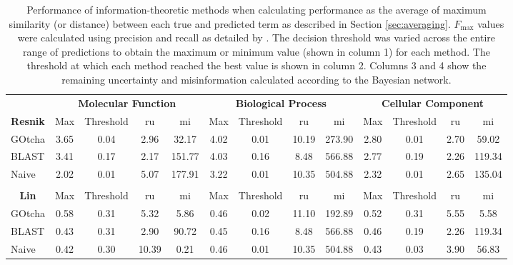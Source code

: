 \begin{table}[h!]
\caption[Performance evaluation of metrics using max-averaging]{Performance of information-theoretic methods when calculating performance as the average of maximum similarity (or distance) between each true and predicted term as described in Section \ref{sec:averaging}. $F_{\max}$ values were calculated using precision and recall as detailed by  \citet{Verspoor2006}. The decision threshold was varied across the entire range of predictions to obtain the maximum or minimum value (shown in column 1) for each method. The threshold at which each method reached the best value is shown in column 2. Columns 3 and 4 show the remaining uncertainty and misinformation calculated according to the Bayesian network.
\label{tab:rumiS1}}
\resizebox{\columnwidth}{!}
{\begin{tabular}{c|cccc|cccc|cccc}

\multicolumn{1}{l}{\hphantom} &\multicolumn{4}{c}{\bf Molecular Function } & \multicolumn{4}{c}{\bf Biological Process} &  \multicolumn{4}{c}{\bf Cellular Component } \\


\bf Resnik & Max & Threshold & ru & mi & Max & Threshold & ru & mi & Max & Threshold & ru & mi\\
\hline
\multicolumn{1}{l|}{GOtcha}& 3.65 & 0.04 & 2.96 & 32.17 & 4.02 & 0.01 & 10.19 & 273.90 & 2.80 & 0.01 & 2.70 & 59.02 \\
\multicolumn{1}{l|}{BLAST}& 3.41 & 0.17 & 2.17 & 151.77 & 4.03 & 0.16 & 8.48 & 566.88 & 2.77 & 0.19 & 2.26 & 119.34 \\
\multicolumn{1}{l|}{Naive}& 2.02 & 0.01 & 5.07 & 177.91 & 3.22 & 0.01 & 10.35 & 504.88 & 2.32 & 0.01 & 2.65 & 135.04 \\


\multicolumn{1}{l}{\hphantom} & & & &\multicolumn{1}{c}{\hphantom} & & & & \multicolumn{1}{c}{\hphantom} & & & &\\

\bf Lin & Max & Threshold & ru & mi & Max & Threshold & ru & mi & Max & Threshold & ru & mi\\
\hline
\multicolumn{1}{l|}{GOtcha}& 0.58 & 0.31 & 5.32 & 5.86 & 0.46 & 0.02 & 11.10 & 192.89 & 0.52 & 0.31 & 5.55 & 5.58 \\
\multicolumn{1}{l|}{BLAST}& 0.43 & 0.31 & 2.90 & 90.72 & 0.45 & 0.16 & 8.48 & 566.88 & 0.46 & 0.19 & 2.26 & 119.34 \\
\multicolumn{1}{l|}{Naive}& 0.42 & 0.30 & 10.39 & 0.21 & 0.46 & 0.01 & 10.35 & 504.88 & 0.43 & 0.03 & 3.90 & 56.83 \\



\end{tabular}}
\end{table}
